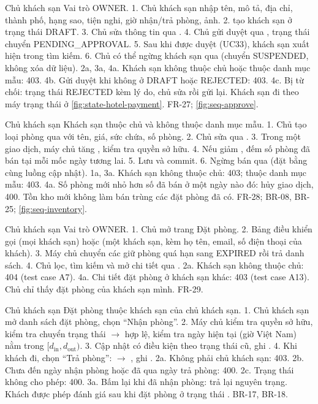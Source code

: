 {Chủ khách sạn}
{Vai trò OWNER.}
{1. Chủ khách sạn nhập tên, mô tả, địa chỉ, thành phố, hạng sao, tiện nghi, giờ nhận/trả phòng, ảnh. 2.  tạo khách sạn ở trạng thái DRAFT. 3. Chủ sửa thông tin qua . 4. Chủ gửi duyệt qua , trạng thái chuyển PENDING\_APPROVAL. 5. Sau khi được duyệt (UC33), khách sạn xuất hiện trong tìm kiếm. 6. Chủ có thể ngừng khách sạn qua  (chuyển SUSPENDED, không xóa dữ liệu).}
{2a, 3a, 4a. Khách sạn không thuộc chủ hoặc thuộc danh mục mẫu: 403. 4b. Gửi duyệt khi không ở DRAFT hoặc REJECTED: 403. 4c. Bị từ chối: trạng thái REJECTED kèm lý do, chủ sửa rồi gửi lại.}
{Khách sạn đi theo máy trạng thái ở \cref{fig:state-hotel-payment}.}
{FR-27; \cref{fig:seq-approve}.}

{Chủ khách sạn}
{Khách sạn thuộc chủ và không thuộc danh mục mẫu.}
{1. Chủ tạo loại phòng qua  với tên, giá, sức chứa, số phòng. 2. Chủ sửa qua . 3. Trong một giao dịch, máy chủ tăng , kiểm tra quyền sở hữu. 4. Nếu giảm , đếm số phòng đã bán tại mỗi mốc ngày tương lai. 5. Lưu và commit. 6. Ngừng bán qua  (đặt  bằng cùng luồng cập nhật).}
{1a, 3a. Khách sạn không thuộc chủ: 403; thuộc danh mục mẫu: 403. 4a. Số phòng mới nhỏ hơn số đã bán ở một ngày nào đó: hủy giao dịch, 400.}
{Tồn kho mới không làm bán trùng các đặt phòng đã có.}
{FR-28; BR-08, BR-25; \cref{fig:seq-inventory}.}

{Chủ khách sạn}
{Vai trò OWNER.}
{1. Chủ mở trang Đặt phòng. 2. Bảng điều khiển gọi  (mọi khách sạn) hoặc  (một khách sạn, kèm họ tên, email, số điện thoại của khách). 3. Máy chủ chuyển các giữ phòng quá hạn sang EXPIRED rồi trả danh sách. 4. Chủ lọc, tìm kiếm và mở chi tiết qua .}
{2a. Khách sạn không thuộc chủ: 404 (test case A7). 4a. Chi tiết đặt phòng ở khách sạn khác: 403 (test case A13).}
{Chủ chỉ thấy đặt phòng của khách sạn mình.}
{FR-29.}

{Chủ khách sạn}
{Đặt phòng thuộc khách sạn của chủ khách sạn.}
{1. Chủ khách sạn mở danh sách đặt phòng, chọn ``Nhận phòng''. 2. Máy chủ kiểm tra quyền sở hữu, kiểm tra chuyển trạng thái  $\rightarrow$  hợp lệ, kiểm tra ngày hiện tại (giờ Việt Nam) nằm trong $[d_{\text{in}}, d_{\text{out}})$. 3. Cập nhật có điều kiện theo trạng thái cũ, ghi . 4. Khi khách đi, chọn ``Trả phòng'':  $\rightarrow$ , ghi .}
{2a. Không phải chủ khách sạn: 403. 2b. Chưa đến ngày nhận phòng hoặc đã qua ngày trả phòng: 400. 2c. Trạng thái không cho phép: 400. 3a. Bấm lại khi đã nhận phòng: trả lại nguyên trạng.}
{Khách được phép đánh giá sau khi đặt phòng ở trạng thái .}
{BR-17, BR-18.}

